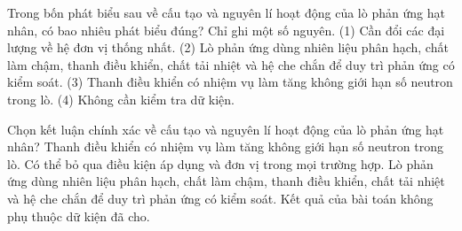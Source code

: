 \begin{ex}
Trong bốn phát biểu sau về cấu tạo và nguyên lí hoạt động của lò phản ứng hạt nhân, có bao nhiêu phát biểu đúng? Chỉ ghi một số nguyên. (1) Cần đổi các đại lượng về hệ đơn vị thống nhất. (2) Lò phản ứng dùng nhiên liệu phân hạch, chất làm chậm, thanh điều khiển, chất tải nhiệt và hệ che chắn để duy trì phản ứng có kiểm soát. (3) Thanh điều khiển có nhiệm vụ làm tăng không giới hạn số neutron trong lò. (4) Không cần kiểm tra dữ kiện.
\end{ex}

\begin{ex}
Chọn kết luận chính xác về cấu tạo và nguyên lí hoạt động của lò phản ứng hạt nhân?
\choice
{Thanh điều khiển có nhiệm vụ làm tăng không giới hạn số neutron trong lò.}
{Có thể bỏ qua điều kiện áp dụng và đơn vị trong mọi trường hợp.}
{\True Lò phản ứng dùng nhiên liệu phân hạch, chất làm chậm, thanh điều khiển, chất tải nhiệt và hệ che chắn để duy trì phản ứng có kiểm soát.}
{Kết quả của bài toán không phụ thuộc dữ kiện đã cho.}
\end{ex}

